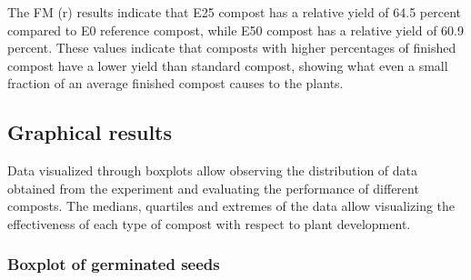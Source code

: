 \documentclass{article}
\begin{document}
The FM (r) results indicate that E25 compost has a relative yield of
64.5 percent compared to E0 reference compost, while E50 compost has
a relative yield of 60.9 percent. These values indicate that composts
with higher percentages of finished compost have a lower yield than
standard compost, showing what even a small fraction of an average
finished compost causes to the plants.

\subsection{Graphical results}
Data visualized through boxplots allow observing the distribution of
data obtained from the experiment and evaluating the performance of
different composts. The medians, quartiles and extremes of the data
allow visualizing the effectiveness of each type of compost with
respect to plant development.

\newpage
\subsubsection{Boxplot of germinated seeds}

\vspace*{.5cm}
\end{document}
